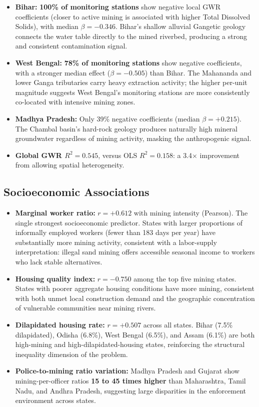 \documentclass[12pt]{article}
\begin{document}
\begin{itemize}
    \item \textbf{Bihar:} \textbf{100\% of monitoring stations} show negative local GWR coefficients (closer to active mining is associated with higher Total Dissolved Solids), with median $\beta = -0.346$. Bihar's shallow alluvial Gangetic geology connects the water table directly to the mined riverbed, producing a strong and consistent contamination signal.
    \item \textbf{West Bengal:} \textbf{78\% of monitoring stations} show negative coefficients, with a stronger median effect ($\beta = -0.505$) than Bihar. The Mahananda and lower Ganga tributaries carry heavy extraction activity; the higher per-unit magnitude suggests West Bengal's monitoring stations are more consistently co-located with intensive mining zones.
    \item \textbf{Madhya Pradesh:} Only 39\% negative coefficients (median $\beta = +0.215$). The Chambal basin's hard-rock geology produces naturally high mineral groundwater regardless of mining activity, masking the anthropogenic signal.
    \item \textbf{Global GWR $R^2 = 0.545$}, versus OLS $R^2 = 0.158$: a 3.4$\times$ improvement from allowing spatial heterogeneity.
\end{itemize}

\subsection{Socioeconomic Associations}

\begin{itemize}
    \item \textbf{Marginal worker ratio:} $r = +0.612$ with mining intensity (Pearson). The single strongest socioeconomic predictor. States with larger proportions of informally employed workers (fewer than 183 days per year) have substantially more mining activity, consistent with a labor-supply interpretation: illegal sand mining offers accessible seasonal income to workers who lack stable alternatives.
    \item \textbf{Housing quality index:} $r = -0.750$ among the top five mining states. States with poorer aggregate housing conditions have more mining, consistent with both unmet local construction demand and the geographic concentration of vulnerable communities near mining rivers.
    \item \textbf{Dilapidated housing rate:} $r = +0.507$ across all states. Bihar (7.5\% dilapidated), Odisha (6.8\%), West Bengal (6.5\%), and Assam (6.1\%) are both high-mining and high-dilapidated-housing states, reinforcing the structural inequality dimension of the problem.
    \item \textbf{Police-to-mining ratio variation:} Madhya Pradesh and Gujarat show mining-per-officer ratios \textbf{15 to 45 times higher} than Maharashtra, Tamil Nadu, and Andhra Pradesh, suggesting large disparities in the enforcement environment across states.
\end{itemize}
\end{document}
